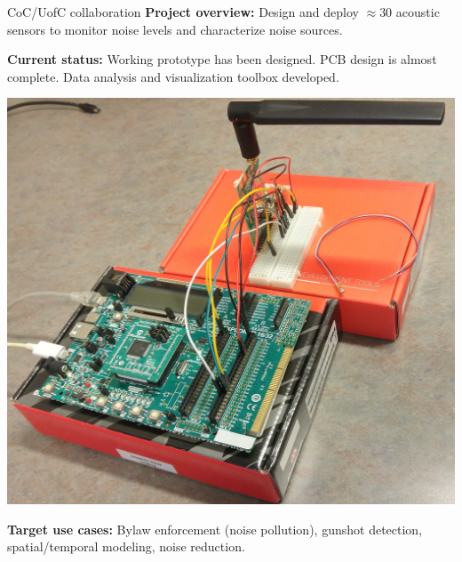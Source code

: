 \documentclass{beamer}
\begin{document}
    \begin{frame}{CoC/UofC collaboration}
        \vspace*{0cm}
        {\bf Project overview:} Design and deploy $\approx 30$ acoustic sensors to monitor noise levels and characterize noise sources.
        \vfill 
        \begin{minipage}{0.5\linewidth}
            {\bf Current status:} Working prototype has been designed. PCB design is almost complete. Data analysis and visualization toolbox developed.
        \end{minipage}
        \hspace*{2mm}
        \begin{minipage}{0.45\linewidth}
            \begin{center}
                \includegraphics[scale=0.04]{figures/20170927_112827_HDR.jpg}
            \end{center}
        \end{minipage}
        \vfill 
        {\bf Target use cases:} Bylaw enforcement (noise pollution), gunshot detection, spatial/temporal modeling, noise reduction. 
    \end{frame}
    
\end{document}
